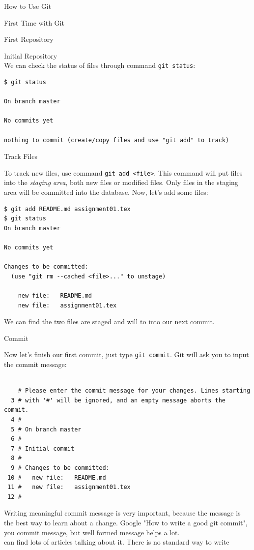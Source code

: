 \documentclass[12pt, a4papaer]{article}
\begin{document}
\begin{section}{How to Use Git}
\begin{subsection}{First Time with Git}
\begin{subsubsection}{First Repository}
\begin{paragraph}{Initial Repository\\}
We can check the status of files through command \verb|git status|:\newpage
\begin{lstlisting}
$ git status

On branch master

No commits yet

nothing to commit (create/copy files and use "git add" to track)
\end{lstlisting}
\end{paragraph}

\begin{paragraph}{Track Files\\}
    
To track new files, use command \verb|git add <file>|.
This command will put files into the \textit{staging area}, both new files or
modified files. Only files in the staging area will be committed into the database.
Now, let's add some files:

\begin{lstlisting}
$ git add README.md assignment01.tex
$ git status
On branch master

No commits yet

Changes to be committed:
  (use "git rm --cached <file>..." to unstage)

	new file:   README.md
	new file:   assignment01.tex
\end{lstlisting}

We can find the two files are staged and will to into our next commit.
\end{paragraph}

\begin{paragraph}{Commit\\}
    
Now let's finish our first commit, just type \verb|git commit|.
Git will ask you to input the commit message:

\begin{lstlisting}

    # Please enter the commit message for your changes. Lines starting
  3 # with '#' will be ignored, and an empty message aborts the commit.
  4 #
  5 # On branch master
  6 #
  7 # Initial commit
  8 #
  9 # Changes to be committed:
 10 #   new file:   README.md
 11 #   new file:   assignment01.tex
 12 #
\end{lstlisting}

Writing meaningful commit message is very important, because the message is the
best way to learn about a change. Google "How to write a good git commit", you 
commit message, but well formed message helps a lot.\\
can find lots of articles talking about it. There is no standard way to write
\end{paragraph}


\end{subsubsection}
\end{subsection}
\end{section}
\end{document}
